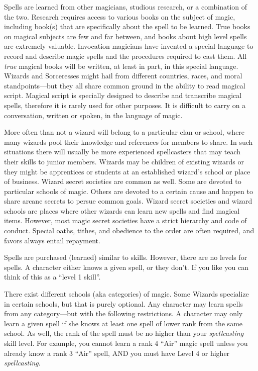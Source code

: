 Spells are learned from other magicians, studious research, or a
combination of the two.  Research requires access to various books on
the subject of magic, including book(s) that are specifically about
the spell to be learned.  True books on magical subjects are few and
far between, and books about high level spells are extremely valuable.
Invocation magicians have invented a special language to record and
describe magic spells and the procedures required to cast them.  All
\emph{true} magical books will be written, at least in part, in this
special language.  Wizards and Sorceresses might hail from different
countries, races, and moral standpoints---but they all share common
ground in the ability to read magical script.  Magical script is
specially designed to describe and transcribe magical spells,
therefore it is rarely used for other purposes.  It is difficult to
carry on a conversation, written or spoken, in the language of magic.

More often than not a wizard will belong to a particular clan or
school, where many wizards pool their knowledge and references for
members to share.  In such situations there will usually be more
experienced spellcasters that may teach their skills to junior
members.  Wizards may be children of existing wizards or they might be
apprentices or students at an established wizard's school or place of
business.  Wizard secret societies are common as well.  Some are
devoted to particular schools of magic.  Others are devoted to a
certain cause and happen to share arcane secrets to persue common
goals.  Wizard secret societies and wizard schools are places where
other wizards can learn new spells and find magical items.  However,
most magic secret societies have a strict hierarchy and code of
conduct.  Special oaths, tithes, and obedience to the order are often
required, and favors always entail repayment.

Spells are purchased (learned) similar to skills.  However, there are
no levels for spells.  A character either knows a given spell, or they
don't.  If you like you can think of this as a ``level 1 skill''.

There exist different schools (aka categories) of magic.  Some Wizards
specialize in certain schools, but that is purely optional.  Any
character may learn spells from any category---but with the following
restrictions.  A character may only learn a given spell if she knows
at least one spell of lower rank from the same school.  As well, the
rank of the spell must be no higher than your \emph{spellcasting}
skill level.  For example, you cannot learn a rank 4 ``Air'' magic
spell unless you already know a rank 3 ``Air'' spell, AND you must
have Level 4 or higher \emph{spellcasting}.

